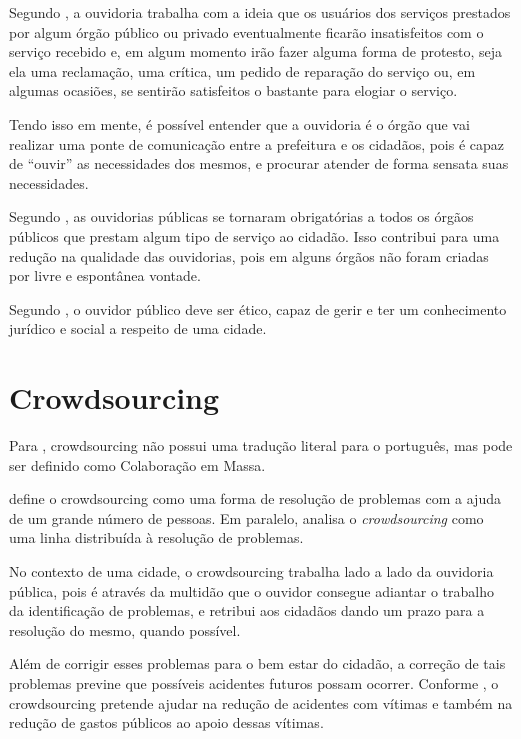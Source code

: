 \documentclass[
	12pt,				%
	openright,			%
	oneside,			%
	a4paper,			%
	english,			%
	french,				%
	spanish,			%
	brazil				%
	]{abntex2}
\begin{document}
Segundo \cite{assis2012ouvidoria}, a ouvidoria trabalha com a ideia que os usuários dos serviços prestados por algum órgão público ou privado eventualmente ficarão insatisfeitos com o serviço recebido e, em algum momento irão fazer alguma forma de protesto, seja ela uma reclamação, uma crítica, um pedido de reparação do serviço ou, em algumas ocasiões, se sentirão satisfeitos o bastante para elogiar o serviço. 

Tendo isso em mente, é possível entender que a ouvidoria é o órgão que vai realizar uma ponte de comunicação entre a prefeitura e os cidadãos, pois é capaz de “ouvir” as necessidades dos mesmos, e procurar atender de forma sensata suas necessidades.

Segundo \cite{assis2012ouvidoria}, as ouvidorias públicas se tornaram obrigatórias a todos os órgãos públicos que prestam algum tipo de serviço ao cidadão. Isso contribui para uma redução na qualidade das ouvidorias, pois em alguns órgãos não foram criadas por livre e espontânea vontade.

Segundo \cite{cardoso2010ouvidoria}, o ouvidor público deve ser ético, capaz de gerir e ter um conhecimento jurídico e social a respeito de uma cidade.

\section{Crowdsourcing}

Para \cite{decrowdbus}, crowdsourcing não possui uma tradução literal para o português, mas pode ser definido como Colaboração em Massa.

\cite{quirino2016estrategias} define o crowdsourcing como uma forma de resolução de problemas com a ajuda de um grande número de pessoas. Em paralelo, \cite{brabham2008crowdsourcing} analisa o \textit{crowdsourcing} como uma linha distribuída à resolução de problemas.

No contexto de uma cidade, o crowdsourcing trabalha lado a lado da ouvidoria pública, pois é através da multidão que o ouvidor consegue adiantar o trabalho da identificação de problemas, e retribui aos cidadãos dando um prazo para a resolução do mesmo, quando possível.

Além de corrigir esses problemas para o bem estar do cidadão, a correção de tais problemas previne que possíveis acidentes futuros possam ocorrer. Conforme \cite{rocha2013youonalert}, o crowdsourcing pretende ajudar na redução de acidentes com vítimas e também na redução de gastos públicos ao apoio dessas vítimas.
\end{document}
